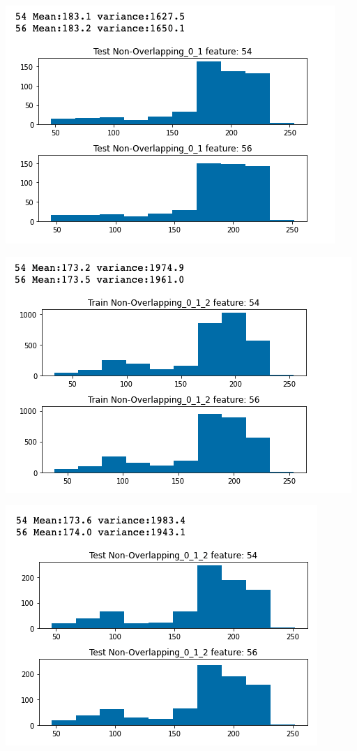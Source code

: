 \documentclass[12pt]{article}
\begin{document}
\begin{multicols*}{2}
\begin{center}
		\includegraphics[scale=0.3]{../screenshot/test_non_over_01.png}

		\includegraphics[scale=0.3]{../screenshot/train_non_over_012.png}

		\includegraphics[scale=0.3]{../screenshot/test_non_over_012.png}


\end{center}
\end{multicols*}
\end{document}
